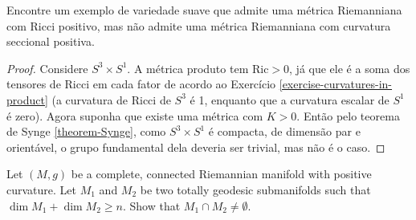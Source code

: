 \documentclass{book}
\begin{document}
\begin{exercise}
\label{exercise-posit-ricci-but-no-posit}
Encontre um exemplo de variedade suave que
admite uma métrica Riemanniana com
Ricci positivo, mas não admite uma métrica
Riemanniana com curvatura seccional
positiva.
\end{exercise}

\begin{proof}
Considere $S^3\times S^1$. A métrica produto
tem $\text{Ric}>0$, já que ele é a
soma dos tensores de Ricci em cada fator de
acordo ao Exercício
\ref{exercise-curvatures-in-product} (a
curvatura de Ricci de $S^3$ é 1,
enquanto que a curvatura escalar de $S^1$ é
zero). Agora suponha que existe uma
 métrica com $K>0$. Então pelo teorema de
 Synge \ref{theorem-Synge}, como
$S^3\times S^1$ é compacta, de dimensão par e
orientável, o grupo fundamental
dela deveria ser trivial, mas não é o caso.
\end{proof}

\begin{exercise}
\label{exercise-two-total-geode-subma}
Let $(M,g)$ be a complete, connected
Riemannian manifold with positive
curvature. Let $M_1$ and $M_2$ be two totally
geodesic submanifolds such that
$\dim M_1+\dim M_2\geq n$. Show that $M_1\cap
M_2\neq \emptyset$.
\end{exercise}
\end{document}
